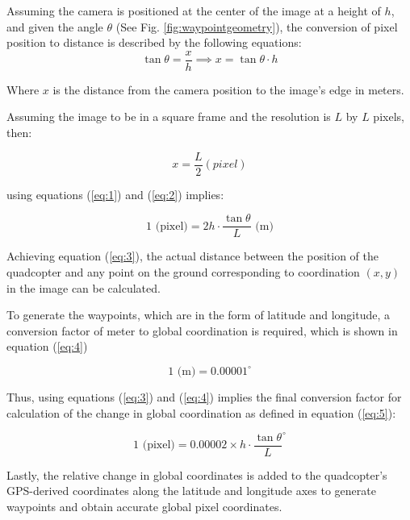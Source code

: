 \documentclass[conference]{IEEEtran}
\begin{document}
	Assuming the camera is positioned at the center of the image at a height of \( h \), and given the angle \( \theta \) (See Fig. \ref{fig:waypointgeometry}), the conversion of pixel position to distance is described by the following equations:
	\begin{equation}
		\tan \theta = \frac{x}{h} \implies x = \tan \theta  \cdot h
		\label{eq:1}
	\end{equation}
	
	Where \( x \) is the distance from the camera position to the image's edge in meters.
	
	Assuming the image to be in a square frame and the resolution is \( L \) by \( L \) pixels, then:
	
	\begin{equation}
		{x}=\frac{L}{2}\left(pixel\right)
		\label{eq:2}
	\end{equation}
	
	using equations (\ref{eq:1}) and (\ref{eq:2}) implies:
	
	\begin{equation}
		1 \text{ (pixel)} = 2h \cdot \frac{\tan \theta}{L} \text{ (m)}
		\label{eq:3}
	\end{equation}
	
	
	Achieving equation (\ref{eq:3}), the actual distance between the position of the quadcopter and any point on the ground corresponding to coordination \((x, y)\) in the image can be calculated. 
	
	To generate the waypoints, which are in the form of latitude and longitude, a conversion factor of meter to global coordination is required, which is shown in equation (\ref{eq:4}) 
	
	\begin{equation}
		1 \text{ (m)} = 0.00001^\circ
		\label{eq:4}
	\end{equation}
	
	Thus, using equations (\ref{eq:3}) and (\ref{eq:4}) implies the final conversion factor for calculation of the change in global coordination as defined in equation (\ref{eq:5}):
	
	\begin{equation}
		1 \text{ (pixel)} = 0.00002 \times h \cdot \frac{\tan \theta}{L}^\circ
		\label{eq:5}
	\end{equation}
	
	Lastly, the relative change in global coordinates is added to the quadcopter's GPS-derived coordinates along the latitude and longitude axes to generate waypoints and obtain accurate global pixel coordinates.
	
\end{document}
